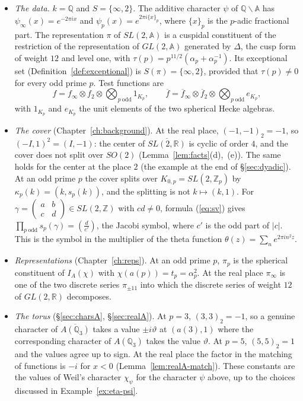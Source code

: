 \documentclass[12pt,letterpaper,openany]{book}
\theoremstyle{plain}
\theoremstyle{definition}
\theoremstyle{remark}
\theoremstyle{remark}
\begin{document}
\begin{itemize}
\item \emph{The data.} $k={\mathbb Q}$ and $S=\{\infty,2\}$. The additive
character $\psi$ of ${\mathbb Q}\backslash{\mathbb A}$ has
$\psi_\infty(x)=e^{-2\pi ix}$ and $\psi_p(x)=e^{2\pi i\{x\}_p}$, where
$\{x\}_p$ is the $p$-adic fractional part. The representation $\pi$ of
$SL(2,{\mathbb A})$ is a cuspidal constituent of the restriction of the
representation of $GL(2,{\mathbb A})$ generated by $\Delta$, the cusp
form of weight $12$ and level one, with
$\tau(p)=p^{11/2}(\alpha_p+\alpha_p^{-1})$. Its exceptional set
(Definition~\ref{def:exceptional}) is $S(\pi)=\{\infty,2\}$, provided
that $\tau(p)\neq0$ for every odd prime $p$. Test functions are
\[
f=f_\infty\otimes f_2\otimes\bigotimes_{p\ \mathrm{odd}}1_{K_p},\qquad
\overline f=\overline f_\infty\otimes\overline f_2\otimes
\bigotimes_{p\ \mathrm{odd}}e_{K_p},
\]
with $1_{K_p}$ and $e_{K_p}$ the unit elements of the two spherical Hecke
algebras.

\item \emph{The cover} (Chapter~\ref{ch:background}). At the real place,
$(-1,-1)_2=-1$, so $(-I,1)^2=(I,-1)$: the center of
$\overline{SL(2,{\mathbb R})}$ is cyclic of order $4$, and the cover does
not split over $SO(2)$ (Lemma~\ref{lem:facts}(d),~(e)). The same holds
for the center at the place $2$ (the example at the end of
\S\ref{sec:dyadic}). At an odd prime $p$ the cover splits over
$K_{0,p}=SL(2,{\mathbb Z}_p)$ by $\kappa_p(k)=(k,s_p(k))$, and the
splitting is not $k\mapsto(k,1)$. For
$\gamma=\left(\begin{smallmatrix}a&b\\c&d\end{smallmatrix}\right)\in
SL(2,{\mathbb Z})$ with $cd\neq0$, formula (\ref{eq:sv}) gives
$\prod_{p\ \mathrm{odd}}s_p(\gamma)=\left(\frac d{c'}\right)$, the Jacobi
symbol, where $c'$ is the odd part of $|c|$. This is the symbol in the
multiplier of the theta function $\theta(z)=\sum_ne^{2\pi in^2z}$.

\item \emph{Representations} (Chapter~\ref{ch:reps}). At an odd prime
$p$, $\pi_p$ is the spherical constituent of $I_A(\chi)$ with
$\chi(a(p))=t_p=\alpha_p^2$. At the real place $\pi_\infty$ is one of the
two discrete series $\pi_{\pm11}$ into which the discrete series of
weight $12$ of $GL(2,{\mathbb R})$ decomposes.

\item \emph{The torus} (\S\ref{sec:charsA}, \S\ref{sec:realA}). At $p=3$,
$(3,3)_2=-1$, so a genuine character of $\overline{A({\mathbb Q}_3)}$
takes a value $\pm i\vartheta$ at $(a(3),1)$ where the corresponding
character of $A({\mathbb Q}_3)$ takes the value $\vartheta$. At $p=5$,
$(5,5)_2=1$ and the values agree up to sign. At the real place the
factor in the matching of functions is $-i$ for $x<0$
(Lemma~\ref{lem:realA-match}). These constants are the values of Weil's
character $\chi_\psi$ for the character $\psi$ above, up to the choices
discussed in Example~\ref{ex:eta-psi}.


\end{itemize}
\end{document}
